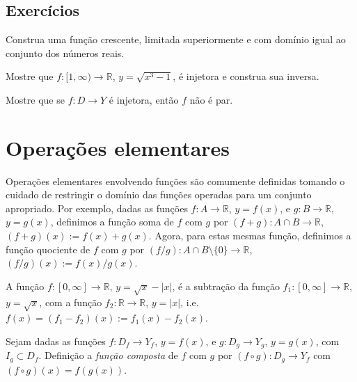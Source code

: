 \subsection*{Exercícios}

\construirExer

\begin{exer}
  Construa uma função crescente, limitada superiormente e com domínio igual ao conjunto dos números reais.
\end{exer}
\begin{resp}
  \construirResp
\end{resp}

\begin{exer}
  Mostre que $f:[1, \infty)\to \mathbb{R}$, $y = \sqrt{x^3 - 1}$, é injetora e construa sua inversa.
\end{exer}
\begin{resp}
  \construirResp
\end{resp}

\begin{exer}
  Mostre que se $f:D\to Y$ é injetora, então $f$ não é par.
\end{exer}
\begin{resp}
  \construirResp
\end{resp}

\section{Operações elementares}

Operações elementares envolvendo funções são comumente definidas tomando o cuidado de restringir o domínio das funções operadas para um conjunto apropriado. Por exemplo, dadas as funções $f:A\to \mathbb{R}$, $y=f(x)$, e $g:B\to\mathbb{R}$, $y=g(x)$, definimos a função soma de $f$ com $g$ por $(f+g):A\cap B\to\mathbb{R}$, $(f+g)(x) := f(x) + g(x)$. Agora, para estas mesmas função, definimos a função quociente de $f$ com $g$ por $(f/g):A\cap B\setminus \{0\}\to\mathbb{R}$, $(f/g)(x) := f(x)/g(x)$.

\begin{ex}
  A função $f:[0, \infty]\to\mathbb{R}$, $y = \sqrt{x} - |x|$, é a subtração da função $f_1:[0, \infty]\to\mathbb{R}$, $y = \sqrt{x}$, com a função $f_2:\mathbb{R}\to\mathbb{R}$, $y = |x|$, i.e. $f(x) = (f_1-f_2)(x):= f_1(x) - f_2(x)$.
\end{ex}

\begin{defn}
  Sejam dadas as funções $f:D_f\to Y_f$, $y = f(x)$, e $g:D_g\to Y_g$, $y = g(x)$, com $I_g\subset D_f$. Definição a \emph{função composta} de $f$ com $g$ por $(f\circ g):D_g\to Y_f$ com $(f\circ g)(x) = f\left(g(x)\right)$.
\end{defn}


